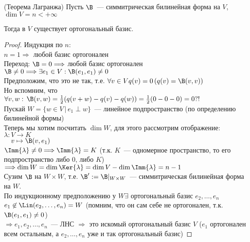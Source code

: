\begin{theorem}(Теорема Лагранжа)
    Пусть $\B$~--- симмитрическая билинейная форма на $V$, $\dim V = n < +\infty$

    Тогда в $V$ существует ортогональный базис.

    \begin{proof}
    \emptyln
        Индукция по $n:$ \\
        $n = 1 \Longrightarrow$ любой базис ортогонален \\
        Переход:
        $\B = 0 \Longrightarrow$ любой базис ортогонален \\
        $\B \neq 0 \Longrightarrow \exists e_1 \in V: \B(e_1, e_1) \neq 0$ \\
        Предположим, что это не так, т.е. $\forall v \in V q(v) = 0 \, (q(v) = \B(v, v))$ \\
        Но вспомним, что $\forall v, w: \, \B(v, w) = \frac{1}{2}( q(v + w) - q(v) - q(w) ) = \frac{1}{2}(0 - 0 - 0) = 0 ?!$ \\
        Пускай $W = \{ w \in V \, | \, e_1 \perp w \}$~--- линейное подпространство (по определению билинейной формы) \\
        Теперь мы хотим посчитать $\dim{W}$, для этого рассмотрим отображение: \\
        $\lambda: V \to K$ \\
        $\quad v \mapsto \B(v, e_1)$ \\
        $\Imm{\lambda} \neq 0 \Longrightarrow \Imm{\lambda} = K$ (т.к. $K$~--- одномерное пространство, то его подпространство либо $0$, либо $K$) \\
        $\Longrightarrow \dim{W} = \dim{\Ker{\lambda}} = \dim{V} - \dim{\Imm{\lambda}} = n - 1$ \\
        Сузим $\B$ на $W \times W$, т.е. $\B' := \B |_{W \times W}$~--- симмитрическая билинейная форма на $W$. \\
        По индукционному предположению у $W \exists$ ортогональный базис $e_2, \dots, e_n$ \\
        $e_1 \not \in \Lin(e_2, \dots, e_n) = W$ (помним, что он сам себе не ортогонален, т.к. $\B(e_1, e_1) \neq 0$) \\
        $\Longrightarrow e_1, e_2, \dots, e_n$~--- ЛНС $\Longrightarrow$ это искомый ортогональный базис $V$ ($e_1$ ортогонален всем остальным, а $e_2, \dots, e_n$ уже и так ортогональный базис)
    \end{proof}
\end{theorem}

